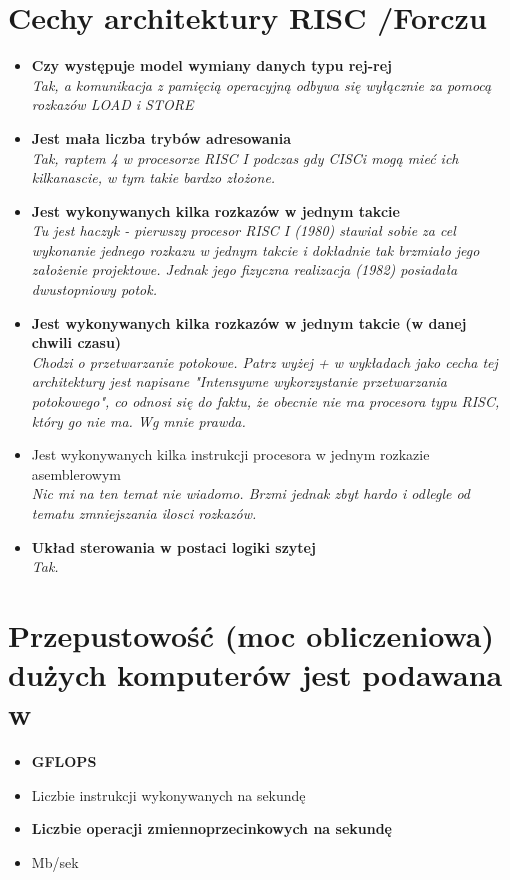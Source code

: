 \documentclass[a4paper,twoside]{article}
\begin{document}
\section{Cechy architektury RISC {\small /Forczu}}
	\begin{itemize}
    \item \textbf{Czy występuje model wymiany danych typu rej-rej}\\
    {\small \emph{Tak, a komunikacja z pamięcią operacyjną odbywa się wyłącznie za pomocą rozkazów LOAD i STORE}}
    \item \textbf{Jest mała liczba trybów adresowania}\\
    {\small \emph{Tak, raptem 4 w procesorze RISC I podczas gdy CISCi mogą mieć ich kilkanascie, w tym takie bardzo złożone.}}
    \item \textbf{Jest wykonywanych kilka rozkazów w jednym takcie}\\
    {\small \emph{Tu jest haczyk - pierwszy procesor RISC I (1980) stawiał sobie za cel wykonanie \emph{jednego rozkazu w jednym takcie} i dokładnie tak brzmiało jego założenie projektowe. Jednak jego fizyczna realizacja (1982) posiadała dwustopniowy potok.}}
    \item \textbf{Jest wykonywanych kilka rozkazów w jednym takcie (w danej chwili czasu)}\\
    {\small \emph{Chodzi o przetwarzanie potokowe. Patrz wyżej + w wykładach jako cecha tej architektury jest napisane "Intensywne wykorzystanie przetwarzania potokowego", co odnosi się do faktu, że obecnie nie ma procesora typu RISC, który go nie ma. Wg mnie prawda.}}
    \item Jest wykonywanych kilka instrukcji procesora w jednym rozkazie asemblerowym\\
    {\small \emph{Nic mi na ten temat nie wiadomo. Brzmi jednak zbyt hardo i odlegle od tematu zmniejszania ilosci rozkazów.}}
    \item \textbf{Układ sterowania w postaci logiki szytej}\\
    {\small \emph{Tak.}}
    \end{itemize}

\section{Przepustowość (moc obliczeniowa) dużych komputerów jest podawana w}
	\begin{itemize}
    \item \textbf{GFLOPS}
    \item Liczbie instrukcji wykonywanych na sekundę
    \item \textbf{Liczbie operacji zmiennoprzecinkowych na sekundę}
    \item Mb/sek
    \end{itemize}
\end{document}
